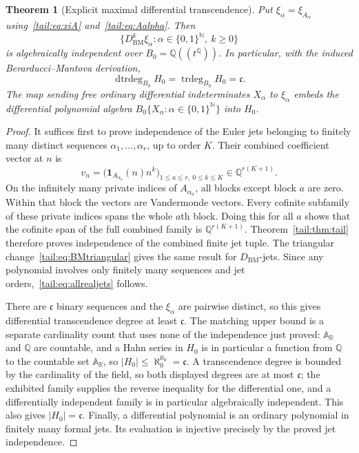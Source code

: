 \documentclass[11pt,a4paper]{article}
\numberwithin{equation}{section}
\newtheorem{theorem}{Theorem}[section]
\theoremstyle{definition}
\theoremstyle{remark}
\newcommand{\R}{\mathbb R}
\newcommand{\Q}{\mathbb Q}
\newcommand{\N}{\mathbb N}
\newcommand{\AR}{\mathbb A_{\R}}
\newcommand{\trdeg}{\operatorname{trdeg}}
\newcommand{\dtrdeg}{\operatorname{dtrdeg}}
\newcommand{\BM}{D_{\mathrm{BM}}}
\newcommand{\cf}{\mathfrak c}
\begin{document}
\begin{theorem}[Explicit maximal differential transcendence]\label{tail:thm:surreal}
Put $\xi_\alpha=\xi_{A_\alpha}$ using~\eqref{tail:eq:xiA} and~\eqref{tail:eq:Aalpha}.
Then
\begin{equation}\label{tail:eq:allrealjets}
 \{\BM^k\xi_\alpha:
       \alpha\in\{0,1\}^{\N},\ k\geq0\}
\end{equation}
is algebraically independent over $B_0=\Q((t^\Q))$.
In particular, with the induced Berarducci--Mantova derivation,
\begin{equation}\label{tail:eq:maxdtrdeg}
 \dtrdeg_{B_0}H_0=\trdeg_{B_0}H_0=\cf.
\end{equation}
The map sending free ordinary differential indeterminates $X_\alpha$
to $\xi_\alpha$ embeds the differential polynomial algebra
$B_0\{X_\alpha:\alpha\in\{0,1\}^{\N}\}$ into $H_0$.
\end{theorem}
\begin{proof}
It suffices first to prove independence of the Euler jets belonging to
finitely many distinct sequences $\alpha_1,\ldots,\alpha_r$, up to order
$K$. Their combined coefficient vector at $n$ is
\[
 v_n=\bigl(\mathbf1_{A_{\alpha_a}}(n)n^k
                  \bigr)_{1\leq a\leq r,\ 0\leq k\leq K}
       \in\Q^{r(K+1)}.
\]
On the infinitely many private indices of $A_{\alpha_a}$, all blocks
except block $a$ are zero. Within that block the vectors are Vandermonde
vectors. Every cofinite subfamily of these private indices spans the
whole $a$th block. Doing this for all $a$ shows that the cofinite span
of the full combined family is $\Q^{r(K+1)}$. Theorem~\ref{tail:thm:tail}
therefore proves independence of the combined finite jet tuple.
The triangular change~\eqref{tail:eq:BMtriangular} gives the same result for
$\BM$-jets. Since any polynomial involves only finitely many sequences
and jet orders,~\eqref{tail:eq:allrealjets} follows.

There are $\cf$ binary sequences and the $\xi_\alpha$ are pairwise
distinct, so this gives differential transcendence degree at least $\cf$.
The matching upper bound is a separate cardinality count that uses none of
the independence just proved: $\AR$ and $\Q$ are countable, and a Hahn
series in $H_0$ is in particular a function from $\Q$ to the countable set
$\AR$, so $|H_0|\leq\aleph_0^{\aleph_0}=\cf$. A transcendence degree is
bounded by the cardinality of the field, so both displayed degrees are at
most $\cf$; the exhibited family supplies the reverse inequality for the
differential one, and a differentially independent family is in particular
algebraically independent. This also gives $|H_0|=\cf$. Finally, a differential polynomial
is an ordinary polynomial in finitely many formal jets. Its evaluation
is injective precisely by the proved jet independence.
\end{proof}
\end{document}
